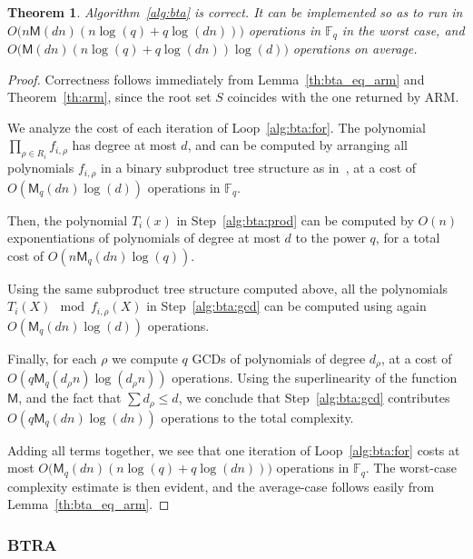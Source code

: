 \documentclass{article}
\newcommand{\ff}[1]{\mathbb{F}_{#1}}
\newcommand{\qq}{q}
\newcommand{\basef}{\ff{\qq}}
\newcommand{\Mul}{\mathsf{M}}
\newtheorem{Theo}{Theorem}
\newcommand{\Notes}[1]{\textcolor{red}{Note: #1}}
\begin{document}
\begin{Theo}
  Algorithm~\ref{alg:bta} is correct. It can be implemented so as to run in
  $O\bigl(n\Mul(dn)(n\log(q) + q\log(dn))\bigr)$ operations in
  $\basef$ in the worst case, and
  $O\bigl(\Mul(dn)(n\log(q) + q\log(dn))\log(d)\bigr)$ operations on
  average.
\end{Theo}
\begin{proof}
  Correctness follows immediately from Lemma~\ref{th:bta_eq_arm} and
  Theorem~\ref{th:arm}, since the root set $S$ coincides with the one
  returned by ARM.

  We analyze the cost of each iteration of
  Loop~\ref{alg:bta:for}. The polynomial
  $\prod_{\rho\in R_i}f_{i,\rho}$ has degree at most $d$, and can be
  computed by arranging all polynomials $f_{i,\rho}$ in a binary
  subproduct tree structure as in~\cite[Lemma~10.4]{Gathen2003}, at a
  cost of $O(\Mul_q(dn)\log(d))$ operations in $\basef$.
  
  Then, the polynomial $T_i(x)$ in Step~\ref{alg:bta:prod} can be
  computed by $O(n)$ exponentiations of polynomials of degree at most
  $d$ to the power $q$, for a total cost of $O(n\Mul_q(dn)\log(q))$.

  Using the same subproduct tree structure computed above, all the
  polynomials $T_i(X)\mod f_{i,\rho}(X)$ in Step~\ref{alg:bta:gcd} can
  be computed using again $O(\Mul_q(dn)\log(d))$ operations. 

  Finally, for each $\rho$ we compute $q$ GCDs of polynomials of
  degree $d_\rho$, at a cost of $O(q\Mul_q(d_\rho n)\log(d_\rho n))$
  operations. Using the superlinearity of the function $\Mul$, and the
  fact that $\sum d_\rho \le d$, we conclude that
  Step~\ref{alg:bta:gcd} contributes $O(q\Mul_q(dn)\log(dn))$
  operations to the total complexity.
  
  Adding all terms together, we see that one iteration of
  Loop~\ref{alg:bta:for} costs at most
  $O\bigl(\Mul_q(dn)(n\log(q) + q\log(dn))\bigr)$ operations in
  $\basef$. The worst-case complexity estimate is then evident, and
  the average-case follows easily from Lemma~\ref{th:bta_eq_arm}.
\end{proof}



\subsubsection{BTRA}
\end{document}
